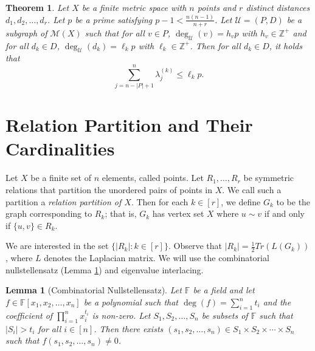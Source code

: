 \documentclass[12pt]{article}
\newcommand{\Z}{\mathbb{Z}}
\newtheorem{thm}{Theorem}[section] %
\newtheorem{lem}{Lemma} %
\theoremstyle{definition}
\begin{document}
	\begin{thm}
		Let $X$ be a finite metric space with $n$ points and $r$ distinct distances $d_1, d_2, \ldots, d_r$.  Let $p$ be a prime satisfying $p-1 < \tfrac{n(n-1)}{n+r}$.  Let $\mathcal{U} = (P,D)$ be a subgraph of $\mathcal{M}(X)$ such that for all $v \in P$, $\deg_{\mathcal{U}}(v) = h_vp$ with $h_v \in \Z^+$ and for all $d_k \in D$, $\deg_{\mathcal{U}}(d_k) = \ell_k p $ with $\ell_k \in \Z^+$.  Then for all $d_k \in D$, it holds that
		$$\sum_{j=n-|P|+1}^n \lambda_j^{(k)} \leq \ell_k p.$$
	\end{thm}

	\fi
	\section{Relation Partition and Their Cardinalities}
	Let $X$ be a finite set of $n$ elements, called points.  Let $R_1, \ldots, R_r$ be symmetric relations that partition the unordered pairs of points in $X$.  We call such a partition a \emph{relation partition of $X$}.  Then for each $k \in [r]$, we define $G_k$ to be the graph corresponding to $R_k$; that is, $G_k$ has vertex set $X$ where $u\sim v$ if and only if $\{u,v\} \in R_k$.  
	
	We are interested in the set $\{|R_k|: k \in [r]\}$.  Observe that $|R_k| = \tfrac{1}{2}Tr(L(G_k))$, where $L$ denotes the Laplacian matrix.  We will use the combinatorial nullstellensatz (Lemma \ref{Lem-CombinatorialNullstellensatz}) and eigenvalue interlacing.
	
	\begin{lem}[Combinatorial Nullstellensatz]\label{Lem-CombinatorialNullstellensatz}
		Let $\mathbb{F}$ be a field and let $f \in \mathbb{F}[x_1,x_2,\ldots,x_n]$ be a polynomial such that $\deg(f) = \sum_{i=1}^n t_i$ and the coefficient of $\prod_{i=1}^n x_i^{t_i}$ is non-zero.  Let $S_1,S_2,\ldots,S_n$ be subsets of $\mathbb{F}$ such that $|S_i| > t_i$ for all $i \in [n]$.  Then there exists $(s_1,s_2,\ldots,s_n) \in S_1 \times S_2 \times \cdots \times S_n$ such that $f(s_1,s_2,\ldots,s_n) \neq 0$.
	\end{lem}

	
\end{document}
